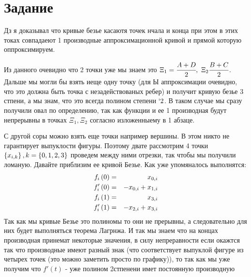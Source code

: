 \section{Задание} 
Дз я доказывал что кривые безье касаютя точек нчала и конца 
при этом в этих токах совпадаеют 1 производные аппроксимационной кривой 
и прямой которую оппроксимируем.

Из данного очевидно что 2 точки уже мы знаем это 
$\Xi_1=\cfrac{A+D}{2}, \ \Xi_2\cfrac{B+C}{2}$. Дальше мы могли 
бы взять иеще одну точку (для Ы аппроксимации очевидно, что 
это должна быть точка с незадействованых ребер) и получит 
кривую безье 3 стпени, а 
мы знам, что это всегда полином степени $\lq 2$. 
В таком случае мы сразу получили овал по определению, так как функции
и ее 1 производная будут непрерывны в точках $\Xi_1, \Xi_2$ 
согласно изложенныему в 1 абзаце.

С другой соры можно взять еще точки например 
вершины. В этом никто не гарантирует выпуклости фигуры.
Поэтому двате рассмотрим 4 точки 
$\left\{ x_{i,k} \right\}, k = \left\{ 0, 1, 2, 3 \right\}$ 
проведем между ними отрезки, так чтобы мы получили ломаную. 
Давайте приблизим ее кривой Безье. Как уже упомяналось выполнятся: 
\begin{eqnarray}
    f_i\left( 0 \right) &=& x_{0,i} \\
    f_i'\left( 0 \right) &=& -x_{0,i} + x_{1,i} \\
    f_i\left( 1 \right) &=& x_{3,i} \\
    f_i'\left( 1 \right) &=& -x_{2,i} + x_{3,i}
\end{eqnarray}
Так как мы кривые Безье это полиномы то они не прерывны, 
а следовательно для них будет выполняться теорема Лагрнжа. 
И так мы знаем что на концах производная принемат некоторые 
значения, в силу непреравности если окажтся так что производные 
имеют разный знак (что соответствует выпуклой фигуре из четырех точек
(это можно заметить просто по графику)), то так как мы уже получим 
что $f'(t)$ - уже полином 2стпенени имет постоянную производную   







